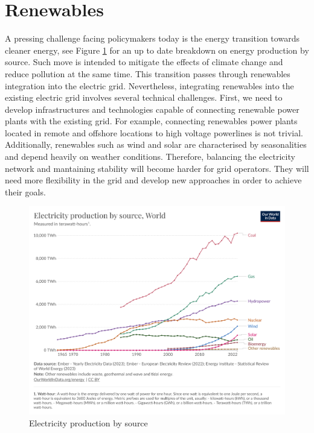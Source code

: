 \section{Renewables}
A pressing challenge facing policymakers today is the energy transition towards cleaner energy, see Figure \ref{fig:electricity_production_by_source} for an up to date breakdown on energy production by source. Such move is intended to mitigate the effects of climate change and reduce pollution at the same time.
This transition passes through renewables integration into the electric grid. 
Nevertheless, integrating renewables into the existing electric grid involves several technical challenges. First, we need to develop infrastructures and technologies capable of connecting renewable power plants with the existing grid. For example, connecting renewables power plants located in remote and offshore locations to high voltage powerlines is not trivial.
Additionally, renewables such as wind and solar are characterised by seasonalities and depend heavily on weather conditions. Therefore, balancing the electricity network and mantaining stability will become harder for grid operators. They will need more flexibility in the grid and develop new approaches in order to achieve their goals.

\begin{figure}[!h]
    \includegraphics[width=\textwidth]{images/electricity-production-by-source.png}
    \caption{Electricity production by source \cite{energy2023statistical}}    
    \label{fig:electricity_production_by_source}
\end{figure}


